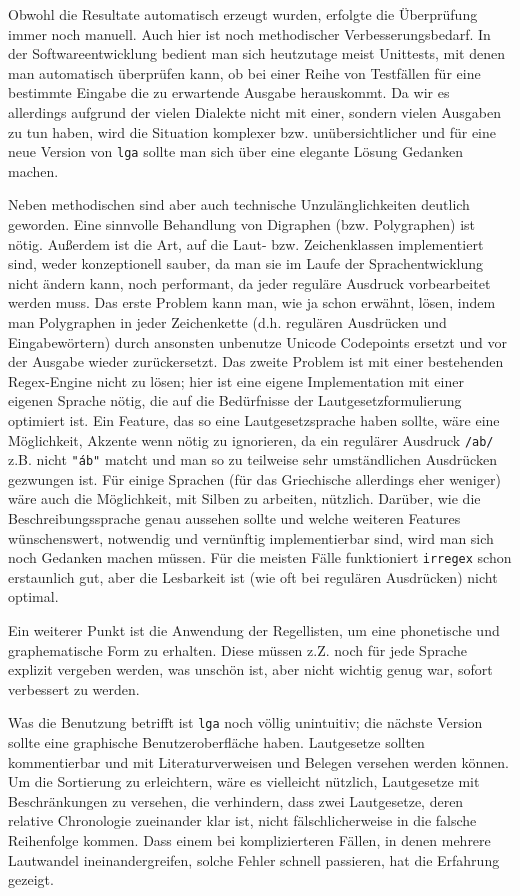 \documentclass[12pt,a4paper,normalheadings,bibliography=totoc]{scrartcl}
\def\tt#1{\texttt{#1}}
\def\rx#1{\texttt{/#1/}}
\def\str#1{\texttt{"#1"}}
\begin{document}
Obwohl die Resultate automatisch erzeugt wurden,
erfolgte die Überprüfung immer noch manuell.
Auch hier ist noch methodischer Verbesserungsbedarf.
In der Softwareentwicklung bedient man sich heutzutage meist Unittests,
mit denen man automatisch überprüfen kann,
ob bei einer Reihe von Testfällen für eine bestimmte Eingabe die
zu erwartende Ausgabe herauskommt.
Da wir es allerdings aufgrund der vielen Dialekte
nicht mit einer, sondern vielen Ausgaben zu tun haben,
wird die Situation komplexer bzw. unübersichtlicher und
für eine neue Version von \tt{lga} sollte man sich über eine elegante
Lösung Gedanken machen.

Neben methodischen sind aber auch technische Unzulänglichkeiten deutlich geworden.
Eine sinnvolle Behandlung von Digraphen (bzw. Polygraphen) ist nötig.
Außerdem ist die Art, auf die Laut- bzw. Zeichenklassen implementiert sind,
weder konzeptionell sauber,
da man sie im Laufe der Sprachentwicklung nicht ändern kann,
noch performant, da jeder reguläre Ausdruck vorbearbeitet werden muss.
Das erste Problem kann man, wie ja schon erwähnt, lösen,
indem man Polygraphen in jeder Zeichenkette
(d.h. regulären Ausdrücken und Eingabewörtern) durch ansonsten unbenutze
Unicode Codepoints ersetzt und vor der Ausgabe wieder zurückersetzt.
Das zweite Problem ist mit einer bestehenden Regex-Engine nicht zu lösen;
hier ist eine eigene Implementation mit einer eigenen Sprache nötig,
die auf die Bedürfnisse der Lautgesetzformulierung optimiert ist.
Ein Feature, das so eine Lautgesetzsprache haben sollte,
wäre eine Möglichkeit, Akzente wenn nötig zu ignorieren,
da ein regulärer Ausdruck \rx{ab} z.B. nicht \str{áb} matcht und man so zu
teilweise sehr umständlichen Ausdrücken gezwungen ist.
Für einige Sprachen (für das Griechische allerdings eher weniger)
wäre auch die Möglichkeit, mit Silben zu arbeiten, nützlich.
Darüber, wie die Beschreibungssprache genau aussehen sollte
und welche weiteren Features wünschenswert, notwendig
und vernünftig implementierbar sind,
wird man sich noch Gedanken machen müssen.
Für die meisten Fälle funktioniert \tt{irregex} schon erstaunlich gut,
aber die Lesbarkeit ist (wie oft bei regulären Ausdrücken) nicht optimal.

Ein weiterer Punkt ist die Anwendung der Regellisten,
um eine phonetische und graphematische Form zu erhalten.
Diese müssen z.Z. noch für jede Sprache explizit vergeben werden,
was unschön ist, aber nicht wichtig genug war,
sofort verbessert zu werden.

Was die Benutzung betrifft ist \tt{lga} noch völlig unintuitiv;
die nächste Version sollte eine graphische Benutzeroberfläche haben.
Lautgesetze sollten kommentierbar und mit Literaturverweisen
und Belegen versehen werden können.
Um die Sortierung zu erleichtern,
wäre es vielleicht nützlich,
Lautgesetze mit Beschränkungen zu versehen,
die verhindern,
dass zwei Lautgesetze, deren relative Chronologie zueinander klar ist,
nicht fälschlicherweise in die falsche Reihenfolge kommen.
Dass einem bei komplizierteren Fällen,
in denen mehrere Lautwandel ineinandergreifen, solche Fehler schnell passieren,
hat die Erfahrung gezeigt.
\end{document}
